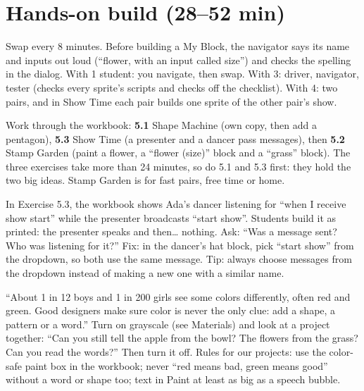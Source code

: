 \section{Hands-on build (28--52 min)}
\begin{pairroles}
Swap every 8 minutes. Before building a My Block, the navigator says its name and inputs out loud (\enquote{flower, with an input called size}) and checks the spelling in the dialog. With 1 student: you navigate, then swap. With 3: driver, navigator, tester (checks every sprite's scripts and checks off the checklist). With 4: two pairs, and in Show Time each pair builds one sprite of the other pair's show.
\end{pairroles}

Work through the workbook: \textbf{5.1} Shape Machine (own copy, then add a pentagon), \textbf{5.3} Show Time (a presenter and a dancer pass messages), then \textbf{5.2} Stamp Garden (paint a flower, a \enquote{flower (size)} block and a \enquote{grass} block). The three exercises take more than 24 minutes, so do 5.1 and 5.3 first: they hold the two big ideas. Stamp Garden is for fast pairs, free time or home.

\begin{bughunt}
In Exercise 5.3, the workbook shows Ada's dancer listening for \enquote{when I receive show start} while the presenter broadcasts \enquote{start show}. Students build it as printed: the presenter speaks and then\ldots{} nothing. Ask: \enquote{Was a message sent? Who was listening for it?} Fix: in the dancer's hat block, pick \enquote{start show} from the dropdown, so both use the same message. Tip: always choose messages from the dropdown instead of making a new one with a similar name.
\end{bughunt}

\begin{safety}
\enquote{About 1 in 12 boys and 1 in 200 girls see some colors differently, often red and green. Good designers make sure color is never the only clue: add a shape, a pattern or a word.} Turn on grayscale (see Materials) and look at a project together: \enquote{Can you still tell the apple from the bowl? The flowers from the grass? Can you read the words?} Then turn it off. Rules for our projects: use the color-safe paint box in the workbook; never \enquote{red means bad, green means good} without a word or shape too; text in Paint at least as big as a speech bubble.
\end{safety}


